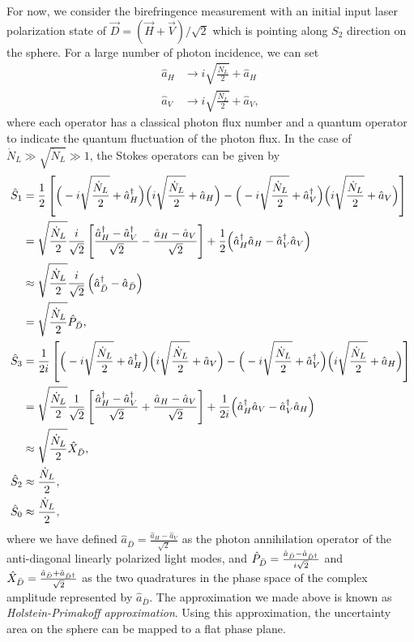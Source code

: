 For now, we consider the birefringence measurement with an initial input laser polarization state of $ \vec{D}=\left( \vec{H}+\vec{V}\right)/\sqrt{2} $ which is pointing along $ S_2 $ direction on the \Poincare sphere. For a large number of photon incidence, we can set 
\begin{subequations}\label{eqs:cohaHV}
\begin{align}
\hat{a}_H &\rightarrow i\sqrt{\frac{\dot{N}_L}{2}} + \hat{a}_H\\
\hat{a}_V &\rightarrow i\sqrt{\frac{\dot{N}_L}{2}} + \hat{a}_V,
\end{align}
\end{subequations}
where each operator has a classical photon flux number and a quantum operator to indicate the quantum fluctuation of the photon flux. In the case of $ \dot{N}_L\gg \sqrt{\dot{N}_L}\gg 1 $, the Stokes operators can be given by
\begin{align}
\hat{S}_1 &= \frac{1}{2}\left[ \Big( -i\sqrt{\frac{\dot{N}_L}{2}} + \hat{a}_H^\dagger \Big) \Big( i\sqrt{\frac{\dot{N}_L}{2}} + \hat{a}_H\Big) -  \Big( -i\sqrt{\frac{\dot{N}_L}{2}} + \hat{a}_V^\dagger\Big)  \Big(i\sqrt{\frac{\dot{N}_L}{2}} + \hat{a}_V \Big) \right]\\
&= \sqrt{\frac{\dot{N}_L}{2}} \frac{i}{\sqrt{2}} \left[\frac{\hat{a}_H^\dagger-\hat{a}_V^\dagger}{\sqrt{2}} - \frac{\hat{a}_H-\hat{a}_V}{\sqrt{2}} \right] + \frac{1}{2} \Big( \hat{a}_H^\dagger \hat{a}_H -  \hat{a}_V^\dagger \hat{a}_V \Big)\\
&\approx \sqrt{\frac{\dot{N}_L}{2}} \frac{i}{\sqrt{2}} \left( \hat{a}_{\bar{D}}^\dagger-\hat{a}_{\bar{D}}\right)\\
&= \sqrt{\frac{\dot{N}_L}{2}} \hat{P}_{\bar{D}},\\
\hat{S}_3 &= \frac{1}{2i} \left[ \Big( -i\sqrt{\frac{\dot{N}_L}{2}} + \hat{a}_H^\dagger \Big) \Big(i\sqrt{\frac{\dot{N}_L}{2}} + \hat{a}_V \Big) -  \Big( -i\sqrt{\frac{\dot{N}_L}{2}} + \hat{a}_V^\dagger\Big) \Big( i\sqrt{\frac{\dot{N}_L}{2}} + \hat{a}_H\Big) \right]\\
&= \sqrt{\frac{\dot{N}_L}{2}}  \frac{1}{\sqrt{2}}\left[ \frac{\hat{a}_H^\dagger-\hat{a}_V^\dagger}{\sqrt{2}} + \frac{\hat{a}_H-\hat{a}_V}{\sqrt{2}} \right] +\frac{1}{2i} \Big( \hat{a}_H^\dagger \hat{a}_V -  \hat{a}_V^\dagger \hat{a}_H \Big)\\
&\approx \sqrt{\frac{\dot{N}_L}{2}} \hat{X}_{\bar{D}},\\
\hat{S}_2 &\approx \frac{\dot{N}_L}{2},\\
\hat{S}_0 &\approx \frac{\dot{N}_L}{2},
\end{align}
where we have defined $ \hat{a}_{\bar{D}} = \frac{\hat{a}_H -\hat{a}_V}{\sqrt{2}} $ as the photon annihilation operator of the anti-diagonal linearly polarized light modes, and $ \hat{P}_{\bar{D}}=\frac{\hat{a}_{\bar{D}}-\hat{a}_{\bar{D}^\dagger}}{i\sqrt{2}} $ and $ \hat{X}_{\bar{D}}=\frac{\hat{a}_{\bar{D}}+\hat{a}_{\bar{D}^\dagger}}{\sqrt{2}} $ as the two quadratures in the phase space of the complex amplitude represented by $ \hat{a}_{\bar{D}} $. The approximation we made above is known as \textit{Holstein-Primakoff approximation}. Using this approximation, the uncertainty area on the \Poincare sphere can be mapped to a flat phase plane. 


